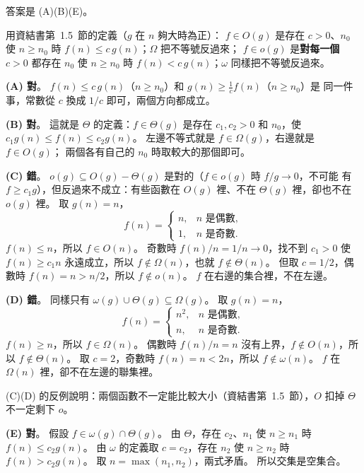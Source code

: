 \begin{pastsoln}
答案是 (A)(B)(E)。

用資結書第~1.5~節的定義（$g$ 在 $n$ 夠大時為正）：
$f \in O(g)$ 是存在 $c > 0$、$n_0$ 使 $n \ge n_0$ 時 $f(n) \le c\,g(n)$；$\Omega$ 把不等號反過來；
$f \in o(g)$ 是\textbf{對每一個} $c > 0$ 都存在 $n_0$ 使 $n \ge n_0$ 時 $f(n) < c\,g(n)$；$\omega$
同樣把不等號反過來。

\textbf{(A) 對}。 $f(n) \le c\,g(n)$（$n \ge n_0$）和 $g(n) \ge \frac{1}{c} f(n)$（$n \ge n_0$）是
同一件事，常數從 $c$ 換成 $1/c$ 即可，兩個方向都成立。

\textbf{(B) 對}。 這就是 $\Theta$ 的定義：$f \in \Theta(g)$ 是存在 $c_1, c_2 > 0$ 和 $n_0$，使
$c_1 g(n) \le f(n) \le c_2 g(n)$。 左邊不等式就是 $f \in \Omega(g)$，右邊就是 $f \in O(g)$；
兩個各有自己的 $n_0$ 時取較大的那個即可。

\textbf{(C) 錯}。 $o(g) \subseteq O(g) - \Theta(g)$ 是對的（$f \in o(g)$ 時 $f/g \to 0$，不可能
有 $f \ge c_1 g$），但反過來不成立：有些函數在 $O(g)$ 裡、不在 $\Theta(g)$ 裡，卻也不在 $o(g)$ 裡。
取 $g(n) = n$，
\[
f(n) = \begin{cases} n, & n \text{ 是偶數}, \\ 1, & n \text{ 是奇數}. \end{cases}
\]
$f(n) \le n$，所以 $f \in O(n)$。 奇數時 $f(n)/n = 1/n \to 0$，找不到 $c_1 > 0$ 使 $f(n) \ge c_1 n$
永遠成立，所以 $f \notin \Omega(n)$，也就 $f \notin \Theta(n)$。 但取 $c = 1/2$，偶數時
$f(n) = n > n/2$，所以 $f \notin o(n)$。 $f$ 在右邊的集合裡，不在左邊。

\textbf{(D) 錯}。 同樣只有 $\omega(g) \cup \Theta(g) \subseteq \Omega(g)$。 取 $g(n) = n$，
\[
f(n) = \begin{cases} n^2, & n \text{ 是偶數}, \\ n, & n \text{ 是奇數}. \end{cases}
\]
$f(n) \ge n$，所以 $f \in \Omega(n)$。 偶數時 $f(n)/n = n$ 沒有上界，$f \notin O(n)$，所以
$f \notin \Theta(n)$。 取 $c = 2$，奇數時 $f(n) = n < 2n$，所以 $f \notin \omega(n)$。 $f$ 在
$\Omega(n)$ 裡，卻不在左邊的聯集裡。

(C)(D) 的反例說明：兩個函數不一定能比較大小（資結書第~1.5~節），$O$ 扣掉 $\Theta$ 不一定剩下
$o$。

\textbf{(E) 對}。 假設 $f \in \omega(g) \cap \Theta(g)$。 由 $\Theta$，存在 $c_2$、$n_1$ 使
$n \ge n_1$ 時 $f(n) \le c_2 g(n)$。 由 $\omega$ 的定義取 $c = c_2$，存在 $n_2$ 使 $n \ge n_2$ 時
$f(n) > c_2 g(n)$。 取 $n = \max(n_1, n_2)$，兩式矛盾。 所以交集是空集合。
\end{pastsoln}
